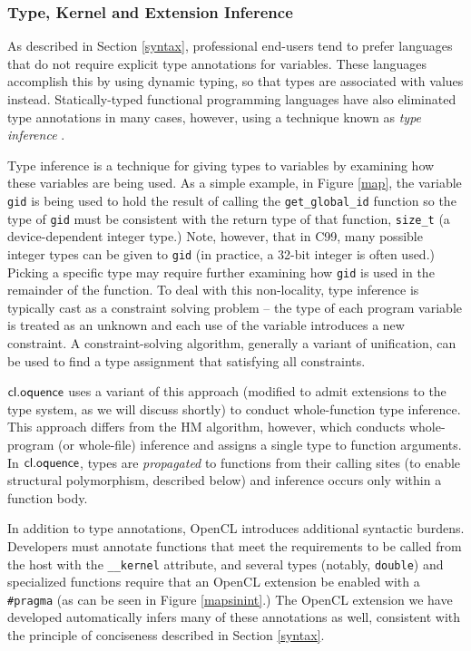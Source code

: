 \documentclass[10pt, conference, compsocconf]{IEEEtran}
\begin{document}
\subsubsection{Type, Kernel and Extension Inference}
As described in Section \ref{syntax}, professional end-users tend to prefer languages that do not require explicit type annotations for variables. These languages accomplish this by using dynamic typing, so that types are associated with values instead. Statically-typed functional programming languages have also eliminated type annotations in many cases, however, using a technique known as {\it type inference} \cite{tapl}. 

Type inference is a technique for giving types to variables by examining how these variables are being used. As a simple example, in Figure \ref{map}, the variable \verb|gid| is being used to hold the result of calling the \verb|get_global_id| function so the type of \verb|gid| must be consistent with the return type of that function, \verb|size_t| (a device-dependent integer type.) Note, however, that in C99, many possible integer types can be given to \verb|gid| (in practice, a 32-bit integer is often used.) Picking a specific type may require further examining how \verb|gid| is used in the remainder of the function. 
To deal with this non-locality, type inference is typically cast as a constraint solving problem -- the type of each program variable is treated as an unknown and each use of the variable introduces a new constraint. A constraint-solving algorithm, generally a variant of unification, can be used to find a type assignment that satisfying all constraints.

$\textsf{cl.oquence}$ uses a variant of this approach (modified to admit extensions to the type system, as we will discuss shortly) to conduct whole-function type inference. This approach differs from the HM algorithm, however, which conducts whole-program (or whole-file) inference and assigns a single type to function arguments. In $\textsf{cl.oquence}$, types are {\it propagated} to functions from their calling sites (to enable structural polymorphism, described below) and inference occurs only within a function body.

In addition to type annotations, OpenCL introduces additional syntactic burdens. Developers must annotate functions that meet the requirements to be called from the host with the \verb|__kernel| attribute, and several types (notably, \verb|double|) and specialized functions require that an OpenCL extension be enabled with a \verb|#pragma| (as  can be seen in Figure \ref{mapsinint}.) The OpenCL extension we have developed automatically infers many of these annotations as well, consistent with the principle of conciseness described in Section \ref{syntax}.
\end{document}
